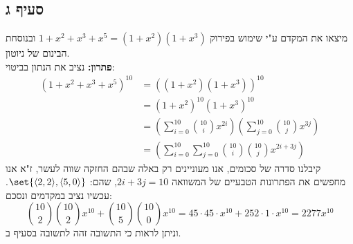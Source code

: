 \documentclass{article}
\DeclarePairedDelimiter\set\{\}
\begin{document}
	\subsection*{סעיף ג}
	מיצאו את המקדם ע"י שימוש בפירוק $1+x^2+x^3+x^5 = (1+x^2)(1+x^3)$ ובנוסחת הבינום של ניוטון. \\
	\textbf{פתרון:}
	נציב את הנתון בביטוי:
	\begin{align*}
		(1+x^2+x^3+x^5)^{10} &=
		((1+x^2)(1+x^3))^{10} \\
		&= (1+x^2)^{10}(1+x^3)^{10} \\
		&=
		\left( \sum_{i=0}^{10} {10 \choose i} x^{2i}  \right)
		\left( \sum_{j=0}^{10} {10 \choose j} x^{3j}  \right) \\
		&= \left( \sum_{i=0}^{10} \sum_{j=0}^{10}  {10 \choose i}{10 \choose j} x^{2i+3j} \right)
	\end{align*}
	קיבלנו סדרה של סכומים, אנו מעוניינים רק באלה שבהם החזקה שווה לעשר, ז"א אנו מחפשים את הפתרונות הטבעיים של המשוואה
	$2i + 3j = 10$, שהם: $\set{\ang{2,2}, \ang{5, 0}}$.
	עכשיו נציב במקדמים ונסכם:
	\[
		{10 \choose 2}{10 \choose 2} x^{10} + {10 \choose 5}{10 \choose 0} x^{10} =
		45 \cdot 45 \cdot x^{10} + 252 \cdot 1 \cdot x^{10} = 2277x^{10}
	\]
	וניתן לראות כי התשובה זהה לתשובה בסעיף ב.


	
\end{document}
